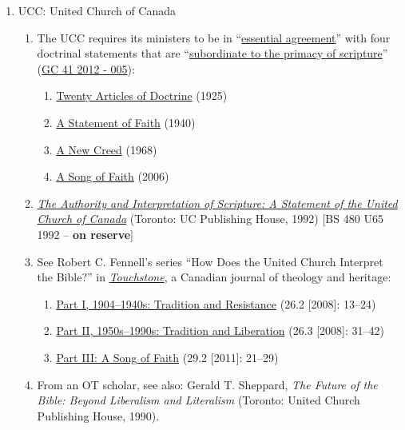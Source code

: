 \documentclass[titlepage]{article}
\begin{document}
\begin{enumerate}
\item UCC: United Church of Canada

	\begin{enumerate}
	\item The UCC requires its ministers to be in ``\href{http://www.united-church.ca/community-faith/welcome-united-church-canada/what-we-believe}{essential agreement}'' with four doctrinal statements that are ``\href{http://www.united-church.ca/community-faith/welcome-united-church-canada/faith-statements}{subordinate to the primacy of scripture}'' (\href{https://commons.united-church.ca/Documents/What%20We%20Believe%20and%20Why/Theology%20and%20Mission%20of%20the%20Church/Our%20Words%20of%20Faith.pdf#search=study}{GC 41 2012 - 005}):
		\begin{enumerate}
			\item\href{http://www.united-church.ca/community-faith/welcome-united-church-canada/twenty-articles-doctrine-1925}{Twenty Articles of Doctrine} (1925)
			\item\href{http://www.united-church.ca/community-faith/welcome-united-church-canada/statement-faith-1940}{A Statement of Faith} (1940)
			\item\href{http://www.united-church.ca/community-faith/welcome-united-church-canada/new-creed}{A New Creed} (1968)
			\item\href{http://www.united-church.ca/community-faith/welcome-united-church-canada/song-faith}{A Song of Faith} (2006)
		\end{enumerate}
	\item \href{https://ecumenism.net/archive/docu/1992_ucc_authority_interpretation_scripture.pdf}{\emph{The Authority and Interpretation of Scripture: A Statement of the United Church of Canada}} (Toronto: UC Publishing House, 1992) [BS 480 U65 1992 -- \textbf{on reserve}]
	\item See Robert C. Fennell's series “How Does the United Church Interpret the Bible?” in \href{http://touchstonecanada.ca}{\emph{Touchstone}}, a Canadian journal of theology and heritage:
		\begin{enumerate}
			\item\href{http://touchstonecanada.ca/wp-content/uploads/2013/08/Article2_2008-051.pdf}{Part I, 1904–1940s: Tradition and Resistance} (26.2 [2008]: 13--24)
			\item\href{http://touchstonecanada.ca/wp-content/uploads/2013/08/3rdArticle_2008-09.pdf}{Part II, 1950s–1990s: Tradition and Liberation} (26.3 [2008]: 31--42)
			\item\href{http://touchstonecanada.ca/wp-content/uploads/2013/08/Touchstone_May_2011.pdf}{Part III: A Song of Faith} (29.2 [2011]: 21--29)
		\end{enumerate}

		\item From an OT scholar, see also: Gerald T. Sheppard, \emph{The Future of the Bible: Beyond Liberalism and Literalism} (Toronto: United Church Publishing House, 1990).

	\end{enumerate}

\end{enumerate}
\end{document}
